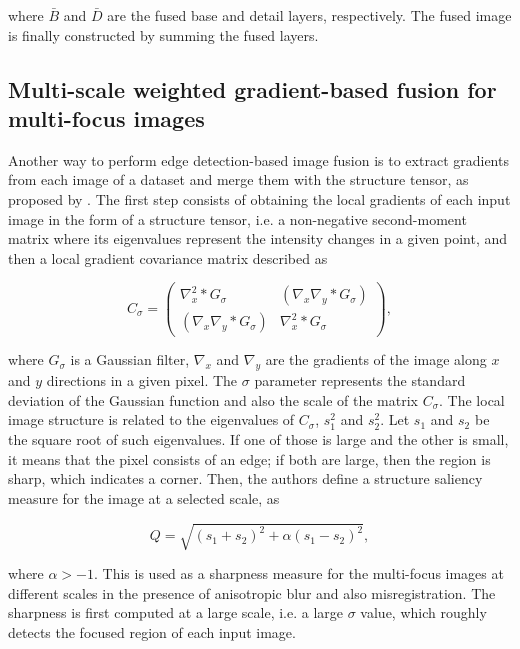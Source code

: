 \noindent where $\bar{B}$ and $\bar{D}$ are the fused base and detail layers, respectively. The fused image is finally constructed by summing the fused layers.

\subsection{Multi-scale weighted gradient-based fusion for multi-focus images}

Another way to perform edge detection-based image fusion is to extract gradients from each image of a dataset and merge them with the structure tensor, as proposed by . The first step consists of obtaining the local gradients of each input image in the form of a structure tensor, i.e. a non-negative second-moment matrix where its eigenvalues represent the intensity changes in a given point, and then a local gradient covariance matrix described as

\begin{equation}
C_{\sigma} =
    \begin{pmatrix}
        \nabla_{x}^{2} \ast G_{\sigma}
        &
        \left(
            \nabla_{x}\nabla_{y} \ast G_{\sigma}
        \right)
        \\
        \left(
            \nabla_{x}\nabla_{y} \ast G_{\sigma}
        \right)
        &
        \nabla_{x}^{2} \ast G_{\sigma}
    \end{pmatrix},
\end{equation}

\noindent where $G_{\sigma}$ is a Gaussian filter, $\nabla_{x}$ and $\nabla_{y}$ are the gradients of the image along $x$ and $y$ directions in a given pixel. The $\sigma$ parameter represents the standard deviation of the Gaussian function and also the scale of the matrix $C_{\sigma}$. The local image structure is related to the eigenvalues of $C_{\sigma}$, $s_{1}^{2}$ and $s_{2}^{2}$. Let $s_{1}$ and $s_{2}$ be the square root of such eigenvalues. If one of those is large and the other is small, it means that the pixel consists of an edge; if both are large, then the region is sharp, which indicates a corner. Then, the authors define a structure saliency measure for the image at a selected scale, as

\begin{equation}
\label{eqn:structure_saliency}
Q = \sqrt{(s_{1} + s_{2})^{2} + \alpha(s_{1} - s_{2})^{2}},
\end{equation}

\noindent where $\alpha > -1$. This is used as a sharpness measure for the multi-focus images at different scales in the presence of anisotropic blur and also misregistration. The sharpness is first computed at a large scale, i.e. a large $\sigma$ value, which roughly detects the focused region of each input image.

